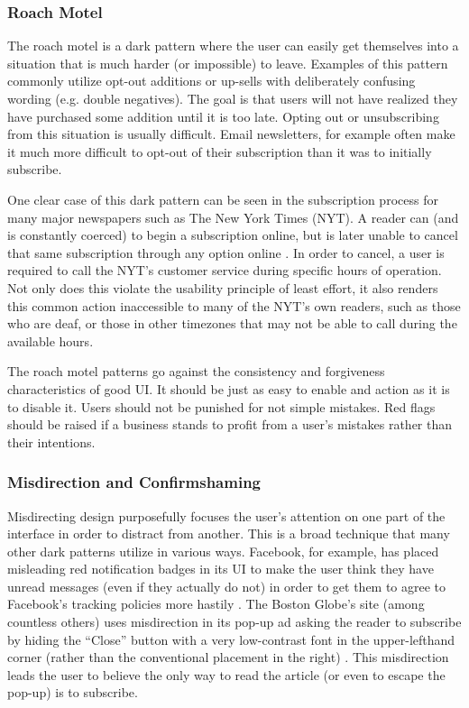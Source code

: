 \documentclass[12pt, oneside]{article}
\begin{document}
\subsubsection{Roach Motel}

The roach motel is a dark pattern where the user can easily get themselves into a situation that is much harder (or impossible) to leave. Examples of this pattern commonly utilize opt-out additions or up-sells with deliberately confusing wording (e.g. double negatives). The goal is that users will not have realized they have purchased some addition until it is too late. Opting out or unsubscribing from this situation is usually difficult. Email newsletters, for example often make it much more difficult to opt-out of their subscription than it was to initially subscribe.

One clear case of this dark pattern can be seen in the subscription process for many major newspapers such as The New York Times (NYT). A reader can (and is constantly coerced) to begin a subscription online, but is later unable to cancel that same subscription through any option online \cite{phillips_2016}. In order to cancel, a user is required to call the NYT's customer service during specific hours of operation. Not only does this violate the usability principle of least effort, it also renders this common action inaccessible to many of the NYT's own readers, such as those who are deaf, or those in other timezones that may not be able to call during the available hours.

The roach motel patterns go against the consistency and forgiveness characteristics of good UI. It should be just as easy to enable and action as it is to disable it. Users should not be punished for not simple mistakes. Red flags should be raised if a business stands to profit from a user's mistakes rather than their intentions.

\subsubsection{Misdirection and Confirmshaming}

Misdirecting design purposefully focuses the user's attention on one part of the interface in order to distract from another. This is a broad technique that many other dark patterns utilize in various ways. Facebook, for example, has placed misleading red notification badges in its UI to make the user think they have unread messages (even if they actually do not) in order to get them to agree to Facebook's tracking policies more hastily \cite{irving_2018}. The Boston Globe's site (among countless others) uses misdirection in its pop-up ad asking the reader to subscribe by hiding the ``Close'' button with a very low-contrast font in the upper-lefthand corner (rather than the conventional placement in the right) \cite{vance_2016}. This misdirection leads the user to believe the only way to read the article (or even to escape the pop-up) is to subscribe.
\end{document}
